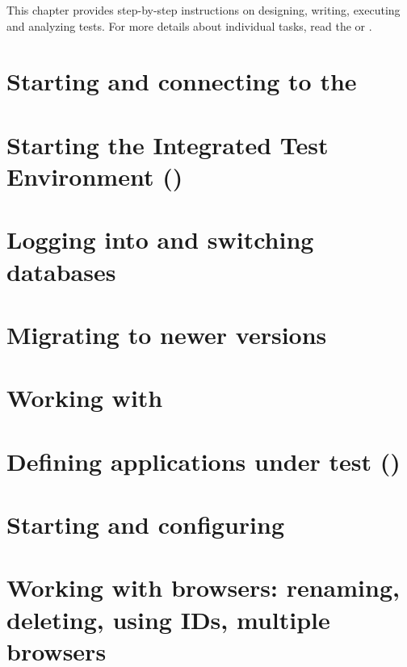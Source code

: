 %
This chapter provides step-by-step instructions on designing, writing, executing and analyzing tests. 
For more details about individual tasks, read the 
 or . 

\section{Starting and connecting to the \gdagent}


\section{Starting the Integrated Test Environment (\ite{})}


\section{Logging into and switching databases}


\section{Migrating to newer versions}


\clearpage

\section{Working with \gdprojects{}}
\label{WorkingWithProjects}


\clearpage
\section{Defining applications under test (\gdauts{})}
\label{Defineaut}


\section{Starting and configuring \gdauts{}}
\label{StartAUT}


\clearpage
\section{Working with browsers: renaming, deleting, using IDs, multiple browsers}
\label{WorkingWithBrowsers}


